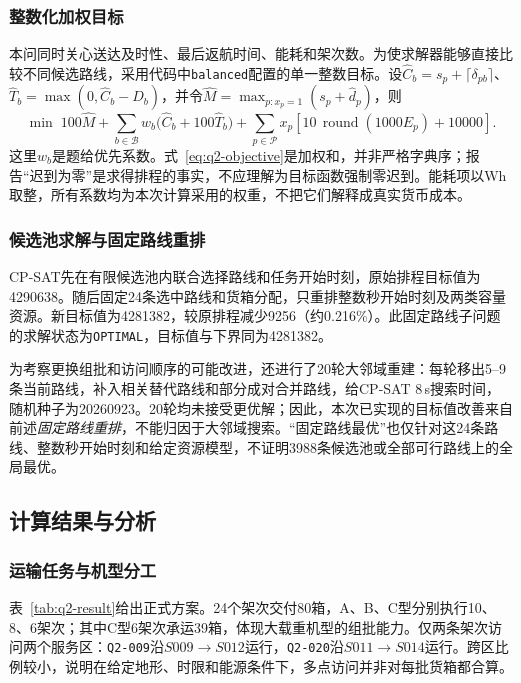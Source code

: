 \documentclass[bwprint,fontset=fandol]{gmcmthesis}
\begin{document}
\subsubsection{整数化加权目标}
本问同时关心送达及时性、最后返航时间、能耗和架次数。为使求解器能够直接比较不同候选路线，采用代码中\texttt{balanced}配置的单一整数目标。设$\widehat C_b=s_p+\lceil\delta_{pb}\rceil$、$\widehat T_b=\max(0,\widehat C_b-D_b)$，并令$\widehat M=\max_{p:x_p=1}(s_p+\widehat d_p)$，则
\begin{equation}
\min\;100\widehat M
+\sum_{b\in\mathcal B}w_b\bigl(\widehat C_b+100\widehat T_b\bigr)
+\sum_{p\in\mathcal P}x_p\left[10\,\operatorname{round}(1000E_p)+10000\right].
\label{eq:q2-objective}
\end{equation}
这里$w_b$是题给优先系数。式~\eqref{eq:q2-objective}是加权和，并非严格字典序；报告“迟到为零”是求得排程的事实，不应理解为目标函数强制零迟到。能耗项以Wh取整，所有系数均为本次计算采用的权重，不把它们解释成真实货币成本。

\subsubsection{候选池求解与固定路线重排}
CP-SAT先在有限候选池内联合选择路线和任务开始时刻，原始排程目标值为4290638。随后固定24条选中路线和货箱分配，只重排整数秒开始时刻及两类容量资源。新目标值为4281382，较原排程减少9256（约0.216\%）。此固定路线子问题的求解状态为\texttt{OPTIMAL}，目标值与下界同为4281382。

为考察更换组批和访问顺序的可能改进，还进行了20轮大邻域重建：每轮移出5--9条当前路线，补入相关替代路线和部分成对合并路线，给CP-SAT 8\,s搜索时间，随机种子为20260923。20轮均未接受更优解；因此，本次已实现的目标值改善来自前述\emph{固定路线重排}，不能归因于大邻域搜索。“固定路线最优”也仅针对这24条路线、整数秒开始时刻和给定资源模型，不证明3988条候选池或全部可行路线上的全局最优。

\subsection{计算结果与分析}
\subsubsection{运输任务与机型分工}
表~\ref{tab:q2-result}给出正式方案。24个架次交付80箱，A、B、C型分别执行10、8、6架次；其中C型6架次承运39箱，体现大载重机型的组批能力。仅两条架次访问两个服务区：\texttt{Q2-009}沿$S009\to S012$运行，\texttt{Q2-020}沿$S011\to S014$运行。跨区比例较小，说明在给定地形、时限和能源条件下，多点访问并非对每批货箱都合算。
\end{document}
